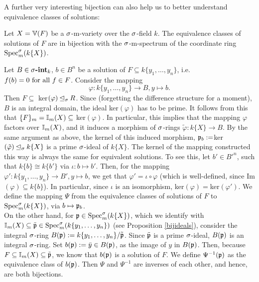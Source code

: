 A further very interesting bijection can also help us to better understand equivalence classes of solutions: 
\begin{prop}\label{bijsols}
Let $X = \mathbb{V}(F)$ be a $\sigma$-m-variety over the $\sigma$-field $k$. The equivalence classes of solutions of $F$ are in bijection with the $\sigma$-m-spectrum of the coordinate ring $\operatorname{Spec}^\sigma_m(k\{X\})$.
\begin{bew}
Let $B \in \sigma\text{{\normalfont\textbf{-int}}}_k$, $b \in B^n$ be a solution of $F \subseteq k\{y_1,\ldots,y_n\}$, i.e. $f(b) = 0 \text{ for all } f \in F$. Consider the mapping $$\varphi: k\{y_1,\ldots,y_n\} \rightarrow B, y \mapsto b.$$
Then $F \subseteq $ ker$( \varphi) \unlhd_{\sigma} R$.
Since (forgetting the difference structure for a moment), $B$ is an integral domain, the ideal ker$(\varphi)$ has to be prime. It follows from this that $\{F\}_m = \mathbb{I}_m(X) \subseteq~$ker$(\varphi)$. 
In particular, this implies that the mapping $\varphi$ factors over $\mathbb{I}_m(X)$, and it induces a morphism of $\sigma$-rings $\tilde \varphi: k\{X\} \rightarrow B$. By the same argument as above, the kernel of this induced
morphism, $\mathfrak{p}_b := $ker$(\tilde \varphi) \unlhd_{\sigma} k\{X\}$ is a prime $\sigma$-ideal of $k\{X\}$. The kernel of the mapping constructed this way is always the same for equivalent solutions. To see this, let $b' \in B'^n$, such that $k\{b\} \cong k\{b'\}$ via $\iota: b \mapsto b'$.
Then, for the mapping $\varphi': k\{y_1, \ldots, y_n\} \rightarrow B', y \mapsto b$, we get that $\varphi' = \iota \circ \varphi$ (which is well-defined, since Im$(\varphi)\subseteq k\{b\}$). In particular, since $\iota$ is an isomorphism, ker$(\varphi) = $ker$(\varphi')$. 
We define the mapping $\Psi$ from the equivalence classes of solutions of $F$ to $\operatorname{Spec}^\sigma_m(k\{X\})$, via $b \mapsto \mathfrak{p}_b$.\\ 

\indent On the other hand, for $\mathfrak{p} \in \operatorname{Spec}^\sigma_m(k\{X\})$, which we identify with \\$\mathbb{I}_m(X) \subseteq \tilde {\mathfrak{p}} \in \operatorname{Spec}^\sigma_m(k\{y_1,\ldots,y_n\})$ (see Proposition \ref{bijideals}), consider the integral $\sigma$-ring $B(\mathfrak{p}):= k\{y_1,\ldots,y_n\}/ \tilde {\mathfrak{p}}$.
Since $\tilde {\mathfrak{p}}$ is a prime $\sigma$-ideal, $B(\mathfrak{p})$ is an integral $\sigma$-ring. Set $b(\mathfrak{p}) := \bar y \in B(\mathfrak{p})$, as the image of $y$ in $B(\mathfrak{p})$. Then, because $F \subseteq \mathbb{I}_m(X) \subseteq \tilde {\mathfrak{p}}$, we know that $b(\mathfrak{p})$ is a solution of $F$. 
We define $\Psi^{-1}(\mathfrak{p})$ as the equivalence class of $b(\mathfrak{p})$. Then $\Psi$ and $\Psi^{-1}$ are inverses of each other, and hence, are both bijections.
\end{bew}
\end{prop}


